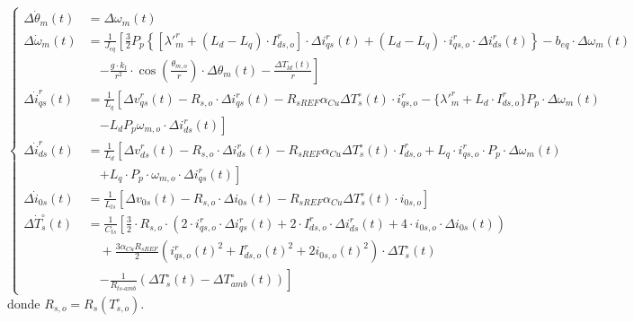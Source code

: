 \documentclass[12pt, a4paper,journal, onecolumn, compsoc]{IEEEtran}
\begin{document}
\begin{equation*}
\left\{
    \begin{aligned}
        \Delta \dot{\theta}_m(t) &= \Delta \omega_m(t) \\[10pt]
        \Delta \dot{\omega}_m(t) &= \frac{1}{J_{eq}} \left[ \frac{3}{2} P_p \left\{ [\lambda'^r_m + (L_d - L_q) \cdot I^r_{ds,o}] \cdot \Delta i_{qs}^r(t) + (L_d - L_q) \cdot i^r_{qs,o} \cdot \Delta i_{ds}^r(t) \right\} - b_{eq} \cdot \Delta \omega_m(t) \right. \\
        &\quad \left. - \frac{g \cdot k_l}{r^2} \cdot \cos\left(\frac{\theta_{m,o}}{r}\right) \cdot \Delta \theta_m(t) - \frac{\Delta T_{ld}(t)}{r} \right] \\[10pt]
        \Delta \dot{i}_{qs}^r(t) &= \frac{1}{L_q} \left[ \Delta v_{qs}^r(t) - R_{s,o} \cdot \Delta i_{qs}^r(t) - R_{sREF} \alpha_{Cu} \Delta T_s^\circ(t) \cdot i^r_{qs,o} - \{\lambda'^r_m + L_d \cdot I^r_{ds,o}\} P_p \cdot \Delta \omega_m(t) \right. \\
        &\quad \left. - L_d P_p \omega_{m,o} \cdot \Delta i_{ds}^r(t) \right] \\[10pt]
        \Delta \dot{i}_{ds}^r(t) &= \frac{1}{L_d} \left[ \Delta v_{ds}^r(t) - R_{s,o} \cdot \Delta i_{ds}^r(t) - R_{sREF} \alpha_{Cu} \Delta T_s^\circ(t) \cdot I^r_{ds,o} + L_q \cdot i^r_{qs,o} \cdot P_p \cdot \Delta \omega_m(t) \right. \\
        &\quad \left. + L_q \cdot P_p \cdot \omega_{m,o} \cdot \Delta i_{qs}^r(t) \right] \\[10pt]
        \Delta \dot{i}_{0s}(t) &= \frac{1}{L_{ls}} \left[ \Delta v_{0s}(t) - R_{s,o} \cdot \Delta i_{0s}(t) - R_{sREF} \alpha_{Cu} \Delta T_s^\circ(t) \cdot i_{0s,o} \right] \\[10pt]
        \Delta \dot{T}_s^\circ(t) &= \frac{1}{C_{ts}} \left[ \frac{3}{2} \cdot R_{s,o} \cdot (2 \cdot i^r_{qs,o} \cdot \Delta i_{qs}^r(t) + 2 \cdot I^r_{ds,o} \cdot \Delta i_{ds}^r(t) + 4 \cdot i_{0s,o} \cdot \Delta i_{0s}(t)) \right. \\
        &\quad + \frac{3 \alpha_{Cu} R_{sREF}}{2} (i^r_{qs,o}(t)^2 + I^r_{ds,o}(t)^2 + 2i_{0s,o}(t)^2) \cdot \Delta T_s^\circ(t) \\
        &\quad \left. - \frac{1}{R_{ts\text{-}amb}} (\Delta T_s^\circ(t) - \Delta T_{amb}^\circ(t)) \right]
    \end{aligned}
\right.
\end{equation*}
donde \(R_{s,o}=R_s(T_{s,o}^\circ)\).
\end{document}
